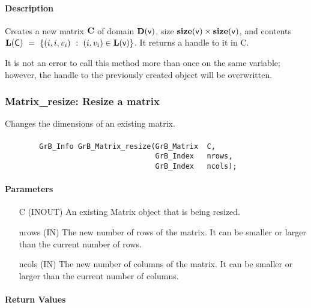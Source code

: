 \paragraph{Description}

Creates a new matrix ${\bf C}$ of domain $\mathbf{D}({\sf v})$, size 
$\mathbf{size}({\sf v}) \times \mathbf{size}({\sf v})$, and contents 
$\mathbf{L}({\sf C})~=~\{ (i, i, v_i) ~:~ (i, v_i) \in \mathbf{L}({\sf v})\}$. 
It returns a handle to it in {\sf C}.

It is not an error to call this method more than once on the same variable;  
however, the handle to the previously created object will be overwritten. 

\subsubsection{{\sf Matrix\_resize}: Resize a matrix}

Changes the dimensions of an existing matrix.

\paragraph{\syntax}

\begin{verbatim}
        GrB_Info GrB_Matrix_resize(GrB_Matrix  C,
                                   GrB_Index   nrows,
                                   GrB_Index   ncols);
\end{verbatim}

\paragraph{Parameters}

\begin{itemize}[leftmargin=1.1in]
    \item[{\sf C}] ({\sf INOUT}) An existing Matrix object that is being resized.
    \item[{\sf nrows}] ({\sf IN}) The new number of rows of the matrix. It can be smaller or larger than the current number of rows.
    \item[{\sf ncols}] ({\sf IN}) The new number of columns of the matrix. It can be smaller or larger than the current number of columns.
\end{itemize}

\paragraph{Return Values}

